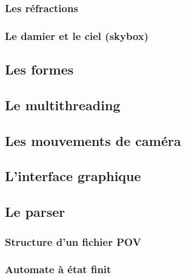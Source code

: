\documentclass[11pt]{article}
\begin{document}
        \subsubsection{Les réfractions}
            \label{refractions}
            

        \subsubsection{Le damier et le ciel (skybox)}
            \label{checkerboardSkybox}

            

    \subsection{Les formes}
	

    \subsection{Le multithreading}

        

    \subsection{Les mouvements de caméra}
        \label{mouvementsCamera}

        

    \subsection{L'interface graphique}

    

    \subsection{Le parser}
        \subsubsection{Structure d'un fichier POV}
        	
        \subsubsection{Automate à état finit}
           	
\end{document}

